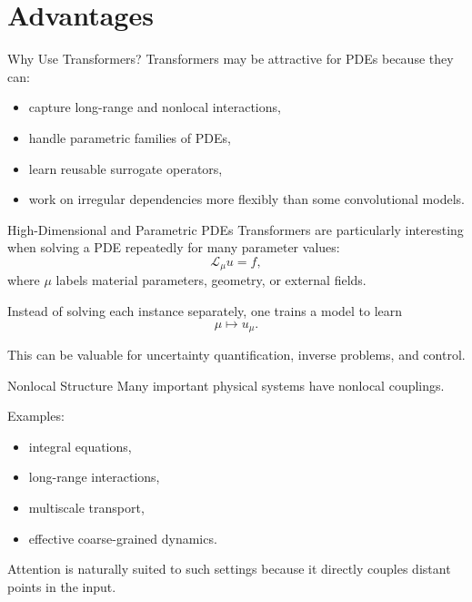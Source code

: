 \documentclass{beamer}
\begin{document}
\section{Advantages}

\begin{frame}{Why Use Transformers?}
Transformers may be attractive for PDEs because they can:
\begin{itemize}
\item capture long-range and nonlocal interactions,
\item handle parametric families of PDEs,
\item learn reusable surrogate operators,
\item work on irregular dependencies more flexibly than some convolutional models.
\end{itemize}
\end{frame}


\begin{frame}{High-Dimensional and Parametric PDEs}
Transformers are particularly interesting when solving a PDE repeatedly for many parameter values:
\[
\mathcal{L}_\mu u = f,
\]
where \(\mu\) labels material parameters, geometry, or external fields.

\medskip

Instead of solving each instance separately, one trains a model to learn
\[
\mu \mapsto u_\mu.
\]

This can be valuable for uncertainty quantification, inverse problems, and control.
\end{frame}


\begin{frame}{Nonlocal Structure}
Many important physical systems have nonlocal couplings.

Examples:
\begin{itemize}
\item integral equations,
\item long-range interactions,
\item multiscale transport,
\item effective coarse-grained dynamics.
\end{itemize}

Attention is naturally suited to such settings because it directly couples distant points in the input.
\end{frame}
\end{document}
